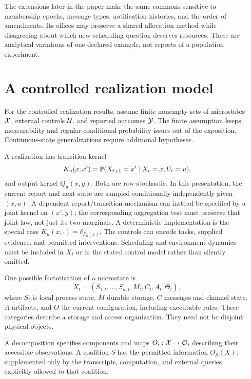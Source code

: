 The extensions later in the paper make the same commons sensitive to membership epochs, message types, notification histories, and the order of amendments. Its offices may preserve a shared allocation method while disagreeing about which new scheduling question deserves resources. These are analytical variations of one declared example, not reports of a population experiment.

\section{A controlled realization model}\label{MS:sec:model}
For the controlled realization results, assume finite nonempty sets of microstates $\mathcal X$, external controls $\mathcal U$, and reported outcomes $\mathcal Y$. The finite assumption keeps measurability and regular-conditional-probability issues out of the exposition. Continuous-state generalizations require additional hypotheses.

A realization has transition kernel
\begin{equation}\label{MS:eq:micro}
K_u(x,x')=\mathbb P(X_{t+1}=x'\mid X_t=x,U_t=u),
\end{equation}
and output kernel $Q_u(x,y)$. Both are row-stochastic. In this presentation, the current report and next state are sampled conditionally independently given $(x,u)$. A dependent report/transition mechanism can instead be specified by a joint kernel on $(x',y)$; the corresponding aggregation test must preserve that joint law, not just its two marginals. A deterministic implementation is the special case $K_u(x,\cdot)=\delta_{F_u(x)}$. The controls can encode tasks, supplied evidence, and permitted interventions. Scheduling and environment dynamics must be included in $X_t$ or in the stated control model rather than silently omitted.

One possible factorization of a microstate is
\[
X_t=(S_{1,t},\ldots,S_{n,t},M_t,C_t,A_t,\Theta_t),
\]
where $S_i$ is local process state, $M$ durable storage, $C$ messages and channel state, $A$ artifacts, and $\Theta$ the current configuration, including executable rules. These categories describe a storage and access organization. They need not be disjoint physical objects.

\begin{MSdefinition}\label{MS:def:access}
A decomposition specifies components and maps $O_i:\mathcal X\to\mathcal O_i$ describing their accessible observations. A coalition $S$ has the permitted information $O_S(X)$, supplemented only by the transcripts, computation, and external queries explicitly allowed to that coalition.
\end{MSdefinition}

